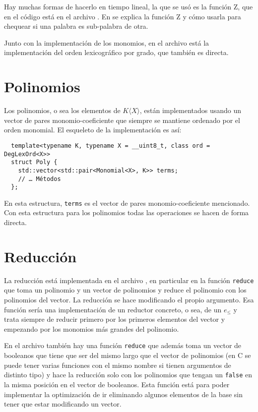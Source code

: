 \documentclass[12pt]{report}
\theoremstyle{customstyle}
\theoremstyle{factstyle}
\newcommand\cpp{C\nolinebreak[4]\hspace{-.05em}\raisebox{.4ex}{\relsize{-3}{\textbf{++}}}\xspace}
\begin{document}
Hay muchas formas de hacerlo en tiempo lineal, la que se usó es la función Z, que en el código está en el archivo . En \cite{web:cp-algo:Zfunc} se explica la función Z y cómo usarla para chequear si una palabra es sub-palabra de otra.

Junto con la implementación de los monomios, en el archivo  está la implementación del orden lexicográfico por grado, que también es directa.

\section{Polinomios}

Los polinomios, o sea los elementos de $K⟨X⟩$, están implementados usando un vector de pares monomio-coeficiente que siempre se mantiene ordenado por el orden monomial. El esqueleto de la implementación es así:

\begin{verbatim}
  template<typename K, typename X = __uint8_t, class ord = DegLexOrd<X>>
  struct Poly {
    std::vector<std::pair<Monomial<X>, K>> terms;
    // … Métodos
  };
\end{verbatim}

En esta estructura, \texttt{terms} es el vector de pares monomio-coeficiente mencionado. Con esta estructura para los polinomios todas las operaciones se hacen de forma directa.

\section{Reducción}

La reducción está implementada en el archivo , en particular en la función \texttt{reduce} que toma un polinomio y un vector de polinomios y reduce el polinomio con los polinomios del vector. La reducción se hace modificando el propio argumento. Esa función sería una implementación de un reductor concreto, o sea, de un $e_≤$ y trata siempre de reducir primero por los primeros elementos del vector y empezando por los monomios más grandes del polinomio.

En el archivo también hay una función \texttt{reduce} que además toma un vector de booleanos que tiene que ser del mismo largo que el vector de polinomios (en \cpp se puede tener varias funciones con el mismo nombre si tienen argumentos de distinto tipo) y hace la reducción solo con los polinomios que tengan un \texttt{false} en la misma posición en el vector de booleanos. Esta función está para poder implementar la optimización de ir eliminando algunos elementos de la base sin tener que estar modificando un vector.
\end{document}
